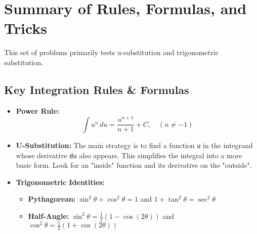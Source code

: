 \documentclass{article}
\begin{document}
\section*{Summary of Rules, Formulas, and Tricks}
This set of problems primarily tests u-substitution and trigonometric substitution.

\subsection*{Key Integration Rules \& Formulas}
\begin{itemize}
    \item \textbf{Power Rule:}
    \[ \int u^n \,du = \frac{u^{n+1}}{n+1} + C, \quad (n \neq -1) \]
    
    \item \textbf{U-Substitution:} The main strategy is to find a function \texttt{u} in the integrand whose derivative \texttt{du} also appears. This simplifies the integral into a more basic form. Look for an "inside" function and its derivative on the "outside".
    
    \item \textbf{Trigonometric Identities:}
    \begin{itemize}
        \item \textbf{Pythagorean:} $ \sin^2\theta + \cos^2\theta = 1 $ \quad and \quad $ 1 + \tan^2\theta = \sec^2\theta $
        \item \textbf{Half-Angle:} $ \sin^2\theta = \frac{1}{2}(1 - \cos(2\theta)) $ \quad and \quad $ \cos^2\theta = \frac{1}{2}(1 + \cos(2\theta)) $
    \end{itemize}
\end{itemize}
\end{document}
